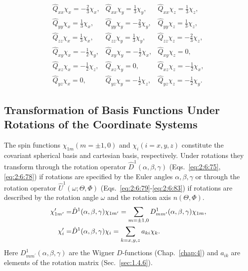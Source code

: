\begin{equation}
\begin{array}{lll}
\hat{Q}_{x x} \chi_{x}=-\frac{2}{3} \chi_{x}, & \hat{Q}_{x x} \chi_{y}=\frac{1}{3} \chi_{y}, & \hat{Q}_{x x} \chi_{z}=\frac{1}{3} \chi_{z}, \\
\hat{Q}_{y y} \chi_{x}=\frac{1}{3} \chi_{x}, & \hat{Q}_{y y} \chi_{y}=-\frac{2}{3} \chi_{y}, & \hat{Q}_{y y} \chi_{z}=\frac{1}{3} \chi_{z} ,\\
\hat{Q}_{z z} \chi_{x}=\frac{1}{3} \chi_{x}, & \hat{Q}_{z z} \chi_{y}=\frac{1}{3} \chi_{y}, & \hat{Q}_{z z} \chi_{z}=-\frac{2}{3} \chi_{z}  ,\\
\hat{Q}_{x y} \chi_{x}=-\frac{1}{2} \chi_{y}, & \hat{Q}_{x y} \chi_{y}=-\frac{1}{2} \chi_{x}, & \hat{Q}_{x y} \chi_{z}=0 ,\\
\hat{Q}_{x z} \chi_{x}=-\frac{1}{2} \chi_{z}, & \hat{Q}_{x z} \chi_{y}=0, & \hat{Q}_{x z} \chi_{z}=-\frac{1}{2} \chi_{x} ,\\
\hat{Q}_{y z} \chi_{x}=0, & \hat{Q}_{y z} \chi_{y}=-\frac{1}{2} \chi_{z}, & \hat{Q}_{y z} \chi_{z}=-\frac{1}{2} \chi_{y}. 
\end{array}\label{eq:6:3:33}
\end{equation}
\subsection{Transformation of Basis Functions Under Rotations of the Coordinate Systems}\label{sec:6.3.5}
The spin functions $\chi_{1 m}(m= \pm 1,0)$ and $\chi_{i}(i=x, y, z)$ constitute the covariant spherical basis and cartesian basis, respectively. Under rotations they transform through the rotation operator $\widehat{D}^{1}(\alpha, \beta, \gamma)$ (Eqs.~\eqref{eq:2:6:75}, \eqref{eq:2:6:78}) if rotations are specified by the Euler angles $\alpha, \beta, \gamma$ or through the rotation operator $\widehat{U}^{1}(\omega ; \Theta, \Phi)$ (Eqs.~\eqref{eq:2:6:79}-\eqref{eq:2:6:83}) if rotations are described by the rotation angle $\omega$ and the rotation axis $n(\Theta, \Phi)$.
\begin{align}
\chi_{1 m^{\prime}}^{\prime}=&\hat{D}^{1}(\alpha, \beta, \gamma) \chi_{1 m^{\prime}}=\sum_{m= \pm 1,0} D_{m m^{\prime}}^{1}(\alpha, \beta, \gamma) \chi_{1 m}, \notag\\
\chi_{i}^{\prime}=&\hat{D}^{1}(\alpha, \beta, \gamma) \chi_{i}=\sum_{k=x, y, z} a_{k i} \chi_{k} . \label{eq:6:3:34}
\end{align}
Here $D_{m m^{\prime}}^{1}(\alpha, \beta, \gamma)$ are the Wigner $D$-functions (Chap.~\ref{chap:4}) and $a_{i k}$ are elements of the rotation matrix (Sec.~\ref{sec:1.4.6}).

